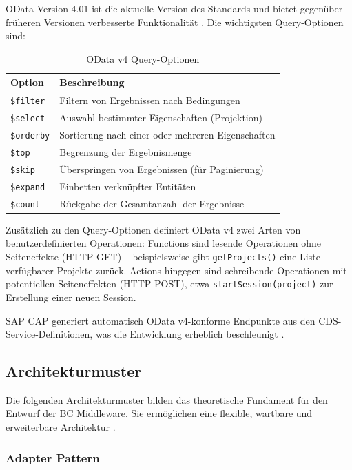 OData Version 4.01 ist die aktuelle Version des Standards und bietet gegenüber früheren Versionen verbesserte Funktionalität \citep{oasis2020odata}. Die wichtigsten Query-Optionen sind:

\begin{table}[H]
\centering
\caption{OData v4 Query-Optionen}
\label{tab:odata-options}
\begin{tabularx}{\textwidth}{l>{\raggedright\arraybackslash}X}
\toprule
\textbf{Option} & \textbf{Beschreibung} \\
\midrule
\texttt{\$filter} & Filtern von Ergebnissen nach Bedingungen \\
\texttt{\$select} & Auswahl bestimmter Eigenschaften (Projektion) \\
\texttt{\$orderby} & Sortierung nach einer oder mehreren Eigenschaften \\
\texttt{\$top} & Begrenzung der Ergebnismenge \\
\texttt{\$skip} & Überspringen von Ergebnissen (für Paginierung) \\
\texttt{\$expand} & Einbetten verknüpfter Entitäten \\
\texttt{\$count} & Rückgabe der Gesamtanzahl der Ergebnisse \\
\bottomrule
\end{tabularx}
\end{table}

Zusätzlich zu den Query-Optionen definiert OData v4 zwei Arten von benutzerdefinierten Operationen: Functions sind lesende Operationen ohne Seiteneffekte (HTTP GET) -- beispielsweise gibt \texttt{getProjects()} eine Liste verfügbarer Projekte zurück. Actions hingegen sind schreibende Operationen mit potentiellen Seiteneffekten (HTTP POST), etwa \texttt{startSession(project)} zur Erstellung einer neuen Session.

SAP CAP generiert automatisch OData v4-konforme Endpunkte aus den CDS-Service-Definitionen, was die Entwicklung erheblich beschleunigt \citep{sap2024cap}.

\subsection{Architekturmuster}

Die folgenden Architekturmuster bilden das theoretische Fundament für den Entwurf der BC Middleware. Sie ermöglichen eine flexible, wartbare und erweiterbare Architektur \citep{bass2021}.

\subsubsection{Adapter Pattern}

